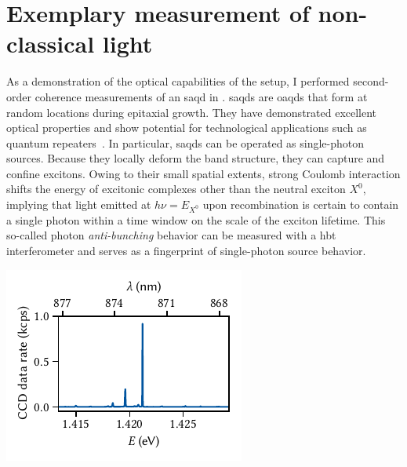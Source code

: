 \section{Exemplary measurement of non-classical light}\label{sec:setup:optics:g2}
As a demonstration of the optical capabilities of the setup, I performed second-order coherence measurements of an  \gls{saqd} in .
\Glspl{saqd} are \glspl{oaqd} that form at random locations during epitaxial growth.
They have demonstrated excellent optical properties and show potential for technological applications such as quantum repeaters~\cite{Petroff2001,Warburton2013,Lodahl2015,Zajac2025}.
In particular, \glspl{saqd} can be operated as single-photon sources.
Because they locally deform the band structure, they can capture and confine excitons.
Owing to their small spatial extents, strong Coulomb interaction shifts the energy of excitonic complexes other than the neutral exciton $X^{0}$, implying that light emitted at $h\nu = E_{X^{0}}$ upon recombination is certain to contain a single photon within a time window on the scale of the exciton lifetime.
This so-called photon \emph{anti-bunching} behavior
can be measured with a \gls{hbt} interferometer and serves as a fingerprint of single-photon source behavior.

\begin{marginfigure}
    \centering
    \includegraphics{img/pdf/setup/ingaas_pl}
    \caption[]{
        \Gls{pl} spectrum of a \gls{saqd} under \gls{cw} excitation at \qty{793}{\nano\meter}.
    }
    \label{fig:setup:optics:ingaas:pl}
\end{marginfigure}

